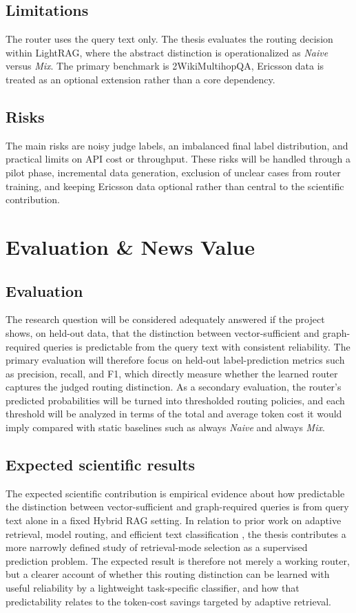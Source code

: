 \documentclass[11pt, a4paper]{article}
\begin{document}
\subsection{Limitations} The router uses the query text only. The thesis evaluates the routing decision within LightRAG, where the abstract distinction is operationalized as \emph{Naive} versus \emph{Mix}. The primary benchmark is 2WikiMultihopQA, Ericsson data is treated as an optional extension rather than a core dependency.

\subsection{Risks} The main risks are noisy judge labels, an imbalanced final label distribution, and practical limits on API cost or throughput. These risks will be handled through a pilot phase, incremental data generation, exclusion of unclear cases from router training, and keeping Ericsson data optional rather than central to the scientific contribution.

\section{Evaluation \& News Value}

\subsection{Evaluation} The research question will be considered adequately answered if the project shows, on held-out data, that the distinction between vector-sufficient and graph-required queries is predictable from the query text with consistent reliability. The primary evaluation will therefore focus on held-out label-prediction metrics such as precision, recall, and F1, which directly measure whether the learned router captures the judged routing distinction. As a secondary evaluation, the router's predicted probabilities will be turned into thresholded routing policies, and each threshold will be analyzed in terms of the total and average token cost it would imply compared with static baselines such as always \emph{Naive} and always \emph{Mix}.

\subsection{Expected scientific results} The expected scientific contribution is empirical evidence about how predictable the distinction between vector-sufficient and graph-required queries is from query text alone in a fixed Hybrid RAG setting. In relation to prior work on adaptive retrieval, model routing, and efficient text classification \cite{jeong2024adaptiverag,hu2024routerbench,benayas2024encoder}, the thesis contributes a more narrowly defined study of retrieval-mode selection as a supervised prediction problem. The expected result is therefore not merely a working router, but a clearer account of whether this routing distinction can be learned with useful reliability by a lightweight task-specific classifier, and how that predictability relates to the token-cost savings targeted by adaptive retrieval.
\end{document}
